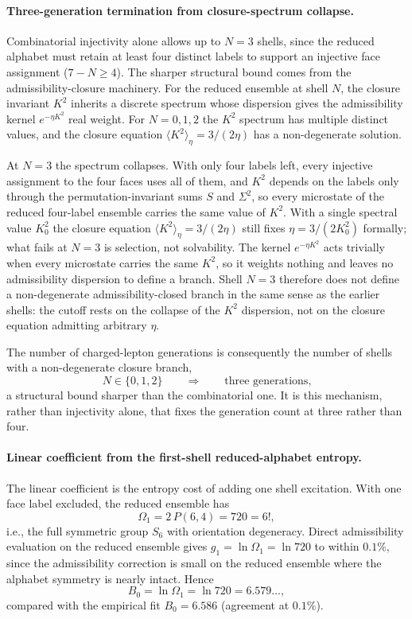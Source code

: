 \documentclass[11pt]{article}
\begin{document}
\paragraph{Three-generation termination from closure-spectrum collapse.}
Combinatorial injectivity alone allows up to $N=3$ shells, since the reduced alphabet must retain at least four distinct labels to support an injective face assignment ($7-N\geq 4$). The sharper structural bound comes from the admissibility-closure machinery. For the reduced ensemble at shell $N$, the closure invariant $K^2$ inherits a discrete spectrum whose dispersion gives the admissibility kernel $e^{-\eta K^2}$ real weight. For $N=0,1,2$ the $K^2$ spectrum has multiple distinct values, and the closure equation $\langle K^2\rangle_\eta=3/(2\eta)$ has a non-degenerate solution.

At $N=3$ the spectrum collapses. With only four labels left, every injective assignment to the four faces uses all of them, and $K^2$ depends on the labels only through the permutation-invariant sums $S$ and $\Sigma^2$, so every microstate of the reduced four-label ensemble carries the same value of $K^2$. With a single spectral value $K_0^2$ the closure equation $\langle K^2\rangle_\eta=3/(2\eta)$ still fixes $\eta=3/(2K_0^2)$ formally; what fails at $N=3$ is selection, not solvability. The kernel $e^{-\eta K^2}$ acts trivially when every microstate carries the same $K^2$, so it weights nothing and leaves no admissibility dispersion to define a branch. Shell $N=3$ therefore does not define a non-degenerate admissibility-closed branch in the same sense as the earlier shells: the cutoff rests on the collapse of the $K^2$ dispersion, not on the closure equation admitting arbitrary $\eta$.

The number of charged-lepton generations is consequently the number of shells with a non-degenerate closure branch,
\[
N\in\{0,1,2\}\qquad\Longrightarrow\qquad\text{three generations,}
\]
a structural bound sharper than the combinatorial one. It is this mechanism, rather than injectivity alone, that fixes the generation count at three rather than four.

\paragraph{Linear coefficient from the first-shell reduced-alphabet entropy.}
The linear coefficient is the entropy cost of adding one shell excitation. With one face label excluded, the reduced ensemble has
\[
\Omega_1=2\,P(6,4)=720=6!,
\]
i.e., the full symmetric group $S_6$ with orientation degeneracy. Direct admissibility evaluation on the reduced ensemble gives $g_1=\ln\Omega_1=\ln 720$ to within $0.1\%$, since the admissibility correction is small on the reduced ensemble where the alphabet symmetry is nearly intact. Hence
\[
B_0=\ln\Omega_1=\ln 720=6.579\ldots,
\]
compared with the empirical fit $B_0=6.586$ (agreement at $0.1\%$).
\end{document}

